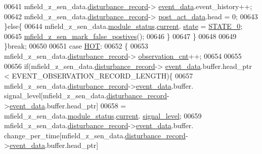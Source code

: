 \begin{DoxyCode}
00641                          mfield\_z\_sen\_data.\hyperlink{a00027_ac9b38e2c1d3f1013a88d33506c754152}{disturbance\_record}->
      \hyperlink{a00028_a8c0bda69e71ef674e60da47ad0be9ab0}{event\_data}.event\_history++;
00642                          mfield\_z\_sen\_data.\hyperlink{a00027_ac9b38e2c1d3f1013a88d33506c754152}{disturbance\_record}->
      \hyperlink{a00028_a9c699c0cc82d0baa6e49195f185ab34f}{post\_act\_data}.head = 0;
00643                    \}\textcolor{keywordflow}{else}\{
00644                          mfield\_z\_sen\_data.\hyperlink{a00027_adfab5a5d8b45a93dfb13edb24e2b80e3}{module\_status}.\hyperlink{a00019_acf41ffc11da291c2f9f0fcb02ee72b98}{current}.
      \hyperlink{a00019_a6b8d8e916bc56265a3fd279bd26b6d1b}{state} = \hyperlink{a00021_ad6739dbbe5581cac99b7dc8a5e09949c}{STATE\_0};
00645                          \hyperlink{a00053_acd2adf617d062b1d3dfc9df79aa2ad32}{mfield\_z\_sen\_mark\_false\_postives}();
00646                     \}
00647              \}
00648 
00649         \}\textcolor{keywordflow}{break};
00650 
00651         \textcolor{keywordflow}{case} \hyperlink{a00021_a1eb14cc432874ddacd1934791dbe12a3}{HOT}:
00652         \{
00653             mfield\_z\_sen\_data.\hyperlink{a00027_ac9b38e2c1d3f1013a88d33506c754152}{disturbance\_record}->
      \hyperlink{a00028_ad5b0bac02ce266b91b2b52a1c3ea1d78}{observation\_cnt}++;
00654 
00655 
00656             \textcolor{keywordflow}{if}(mfield\_z\_sen\_data.\hyperlink{a00027_ac9b38e2c1d3f1013a88d33506c754152}{disturbance\_record}->
      \hyperlink{a00028_a8c0bda69e71ef674e60da47ad0be9ab0}{event\_data}.buffer.head\_ptr < EVENT\_OBSERVATION\_RECORD\_LENGTH)\{
00657             mfield\_z\_sen\_data.\hyperlink{a00027_ac9b38e2c1d3f1013a88d33506c754152}{disturbance\_record}->\hyperlink{a00028_a8c0bda69e71ef674e60da47ad0be9ab0}{event\_data}.buffer.
      signal\_level[mfield\_z\_sen\_data.\hyperlink{a00027_ac9b38e2c1d3f1013a88d33506c754152}{disturbance\_record}->\hyperlink{a00028_a8c0bda69e71ef674e60da47ad0be9ab0}{event\_data}.buffer.head\_ptr]
00658                     = mfield\_z\_sen\_data.\hyperlink{a00027_adfab5a5d8b45a93dfb13edb24e2b80e3}{module\_status}.\hyperlink{a00019_acf41ffc11da291c2f9f0fcb02ee72b98}{current}.
      \hyperlink{a00019_a4070db8eab0ff93e3fbc1df59872f117}{signal\_level};
00659             mfield\_z\_sen\_data.\hyperlink{a00027_ac9b38e2c1d3f1013a88d33506c754152}{disturbance\_record}->\hyperlink{a00028_a8c0bda69e71ef674e60da47ad0be9ab0}{event\_data}.buffer.
      change\_per\_time[mfield\_z\_sen\_data.\hyperlink{a00027_ac9b38e2c1d3f1013a88d33506c754152}{disturbance\_record}->\hyperlink{a00028_a8c0bda69e71ef674e60da47ad0be9ab0}{event\_data}.buffer.head\_ptr]

\end{DoxyCode}
